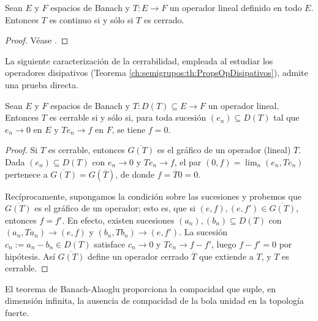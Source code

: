 \begin{Teorema}
\label{ch:preliminares:th:graficoCerrado}

Sean $E$ y $F$ espacios de Banach y $T : E \rightarrow F$ un operador lineal
definido en todo $E$. Entonces $T$ es continuo si y sólo si $T$ es cerrado.
\end{Teorema}

\begin{proof}
Véase \cite[Teorema~2.9]{brezis-2011-fun-ana-sob}.
\end{proof}

La siguiente caracterización de la cerrabilidad, empleada al estudiar los
operadores disipativos (Teorema \ref{ch:semigrupos:th:PropsOpDisipativos}),
admite una prueba directa.\\

\begin{Proposicion}
\label{ch:preliminares:prop:cerrable}

Sean $E$ y $F$ espacios de Banach y $T : D(T) \subseteq E \rightarrow F$ un
operador lineal. Entonces $T$ es cerrable si y sólo si, para toda sucesión
$(e_n) \subseteq D(T)$ tal que $e_n \rightarrow 0$ en $E$ y $Te_n \rightarrow f$
en $F$, se tiene $f = 0$.
\end{Proposicion}

\begin{proof}
Si $T$ es cerrable, entonces $\overline{G(T)}$ es el gráfico de un operador
(lineal) $\overline{T}$. Dada $(e_n) \subseteq D(T)$ con $e_n \rightarrow 0$ y
$Te_n \rightarrow f$, el par $(0, f) = \lim_n (e_n, Te_n)$ pertenece a
$\overline{G(T)} = G(\overline{T})$, de donde $f = \overline{T}0 = 0$.

Recíprocamente, supongamos la condición sobre las sucesiones y probemos que
$\overline{G(T)}$ es el gráfico de un operador; esto es, que si
$(e, f), (e, f') \in \overline{G(T)}$, entonces $f = f'$. En efecto, existen
sucesiones $(a_n), (b_n) \subseteq D(T)$ con $(a_n, Ta_n) \rightarrow (e, f)$ y
$(b_n, Tb_n) \rightarrow (e, f')$. La sucesión $c_n := a_n - b_n \in D(T)$
satisface $c_n \rightarrow 0$ y $Tc_n \rightarrow f - f'$, luego $f - f' = 0$ por
hipótesis. Así $\overline{G(T)}$ define un operador cerrado $\overline{T}$ que
extiende a $T$, y $T$ es cerrable.
\end{proof}

El teorema de Banach-Alaoglu proporciona la compacidad que suple, en dimensión
infinita, la ausencia de compacidad de la bola unidad en la topología fuerte.\\

